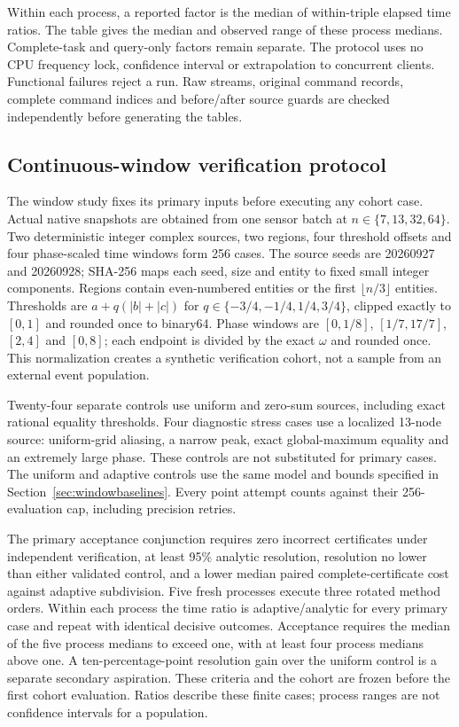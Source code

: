 \documentclass[11pt,a4paper]{article}
\theoremstyle{definition}\newtheorem{definition}[theorem]{Definition}
\begin{document}
Within each process, a reported factor is the median of within-triple elapsed
time ratios. The table gives the median and observed range of these process
medians. Complete-task and query-only factors remain separate. The protocol
uses no CPU frequency lock, confidence interval or extrapolation to concurrent
clients. Functional failures reject a run. Raw streams, original command
records, complete command indices and before/after source guards are checked
independently before generating the tables.

\subsection{Continuous-window verification protocol}\label{sec:windowprotocol}
The window study fixes its primary inputs before executing any cohort case. Actual native snapshots are obtained from one sensor batch at $n\in\{7,13,32,64\}$. Two deterministic integer complex sources, two regions, four threshold offsets and four phase-scaled time windows form 256 cases. The source seeds are 20260927 and 20260928; SHA-256 maps each seed, size and entity to fixed small integer components. Regions contain even-numbered entities or the first $\lfloor n/3\rfloor$ entities. Thresholds are $a+q(|b|+|c|)$ for $q\in\{-3/4,-1/4,1/4,3/4\}$, clipped exactly to $[0,1]$ and rounded once to binary64. Phase windows are $[0,1/8]$, $[1/7,17/7]$, $[2,4]$ and $[0,8]$; each endpoint is divided by the exact $\omega$ and rounded once. This normalization creates a synthetic verification cohort, not a sample from an external event population.

Twenty-four separate controls use uniform and zero-sum sources, including exact rational equality thresholds. Four diagnostic stress cases use a localized 13-node source: uniform-grid aliasing, a narrow peak, exact global-maximum equality and an extremely large phase. These controls are not substituted for primary cases. The uniform and adaptive controls use the same model and bounds specified in Section~\ref{sec:windowbaselines}. Every point attempt counts against their 256-evaluation cap, including precision retries.

The primary acceptance conjunction requires zero incorrect certificates under independent verification, at least 95\% analytic resolution, resolution no lower than either validated control, and a lower median paired complete-certificate cost against adaptive subdivision. Five fresh processes execute three rotated method orders. Within each process the time ratio is adaptive/analytic for every primary case and repeat with identical decisive outcomes. Acceptance requires the median of the five process medians to exceed one, with at least four process medians above one. A ten-percentage-point resolution gain over the uniform control is a separate secondary aspiration. These criteria and the cohort are frozen before the first cohort evaluation. Ratios describe these finite cases; process ranges are not confidence intervals for a population.
\end{document}

